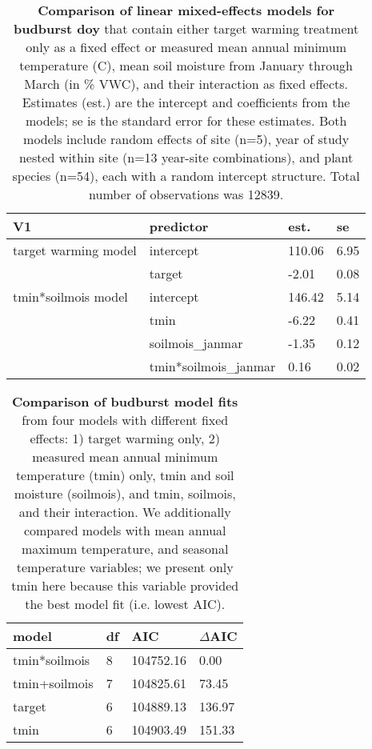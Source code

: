 \documentclass{article}
\begin{document}
\begin{table}[ht]
\centering
\caption{\textbf{Comparison of linear mixed-effects models for budburst doy} that contain either target warming treatment only as a fixed effect or measured mean annual minimum temperature (\degree C), mean soil moisture from January through March (in \% VWC), and their interaction as fixed effects. Estimates (est.) are the intercept and coefficients from the models; se is the standard error for these estimates. Both models include random effects of site (n=5), year of study nested within site (n=13 year-site combinations), and plant species (n=54), each with a random intercept structure. Total number of observations was 12839.} 
\label{table:bbmods}
\begingroup\footnotesize
\begin{tabular}{|p{}|p{}|p{}|p{}|}
  \hline
V1 & predictor & est. & se \\ 
  \hline
target warming model & intercept & 110.06 & 6.95 \\ 
   & target & -2.01 & 0.08 \\ 
   \hline
tmin*soilmois model & intercept & 146.42 & 5.14 \\ 
   & tmin & -6.22 & 0.41 \\ 
   & soilmois\_janmar & -1.35 & 0.12 \\ 
   & tmin*soilmois\_janmar & 0.16 & 0.02 \\ 
   \hline
\end{tabular}
\endgroup
\end{table}%
\begin{table}[ht]
\centering
\caption{\textbf{Comparison of budburst model fits} from four models with different fixed effects: 1) target warming only, 2) measured mean annual minimum temperature (tmin) only, tmin and soil moisture (soilmois), and tmin, soilmois, and their interaction. We additionally compared models with mean annual maximum temperature, and seasonal temperature variables; we present only tmin here because this variable provided the best model fit (i.e. lowest AIC).} 
\label{table:bbaic}
\begingroup\footnotesize
\begin{tabular}{|p{}|p{}|p{}|p{}|}
  \hline
model & df & AIC & $\Delta$AIC \\ 
  \hline
tmin*soilmois & 8 & 104752.16 & 0.00 \\ 
  tmin+soilmois & 7 & 104825.61 & 73.45 \\ 
  target & 6 & 104889.13 & 136.97 \\ 
  tmin & 6 & 104903.49 & 151.33 \\ 
   \hline
\end{tabular}
\endgroup
\end{table}\clearpage
\end{document}
